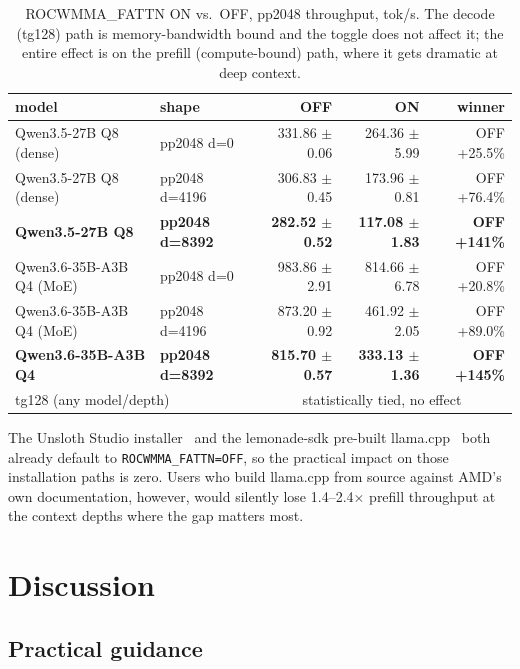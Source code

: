 \documentclass[10pt,a4paper]{article}
\begin{document}
\begin{table}[h]
\centering
\small
\begin{tabular}{llrrr}
\toprule
model & shape & OFF & ON & winner \\
\midrule
Qwen3.5-27B Q8 (dense)  & pp2048 d=0    & 331.86 $\pm$ 0.06 & 264.36 $\pm$ 5.99 & OFF +25.5\% \\
Qwen3.5-27B Q8 (dense)  & pp2048 d=4196 & 306.83 $\pm$ 0.45 & 173.96 $\pm$ 0.81 & OFF +76.4\% \\
\textbf{Qwen3.5-27B Q8} & \textbf{pp2048 d=8392} & \textbf{282.52 $\pm$ 0.52} & \textbf{117.08 $\pm$ 1.83} & \textbf{OFF +141\%} \\
\midrule
Qwen3.6-35B-A3B Q4 (MoE) & pp2048 d=0    & 983.86 $\pm$ 2.91 & 814.66 $\pm$ 6.78 & OFF +20.8\% \\
Qwen3.6-35B-A3B Q4 (MoE) & pp2048 d=4196 & 873.20 $\pm$ 0.92 & 461.92 $\pm$ 2.05 & OFF +89.0\% \\
\textbf{Qwen3.6-35B-A3B Q4} & \textbf{pp2048 d=8392} & \textbf{815.70 $\pm$ 0.57} & \textbf{333.13 $\pm$ 1.36} & \textbf{OFF +145\%} \\
\midrule
\multicolumn{2}{l}{tg128 (any model/depth)} & \multicolumn{3}{c}{statistically tied, no effect} \\
\bottomrule
\end{tabular}
\caption{ROCWMMA\_FATTN ON vs.\ OFF, pp2048 throughput, tok/s. The decode (tg128) path is memory-bandwidth bound and the toggle does not affect it; the entire effect is on the prefill (compute-bound) path, where it gets dramatic at deep context.}
\label{tab:fattn}
\end{table}

The Unsloth Studio installer~\cite{unsloth} and the lemonade-sdk pre-built llama.cpp~\cite{lemonade} both already default to \texttt{ROCWMMA\_FATTN=OFF}, so the practical impact on those installation paths is zero. Users who build llama.cpp from source against AMD's own documentation, however, would silently lose 1.4--2.4$\times$ prefill throughput at the context depths where the gap matters most.

\section{Discussion}

\subsection{Practical guidance}
\end{document}
